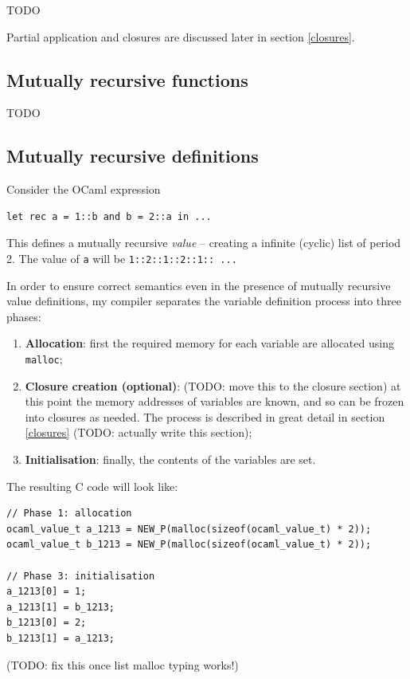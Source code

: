 \documentclass[12pt,a4paper,twoside,openright]{report}
\begin{document}
TODO

Partial application and closures are discussed later in section \ref{closures}.

\subsection{Mutually recursive functions}\label{mutually-recursive-functions}

TODO

\subsection{Mutually recursive definitions}\label{mutually-recursive-values}

Consider the OCaml expression

\begin{lstlisting}
let rec a = 1::b and b = 2::a in ...
\end{lstlisting}

This defines a mutually recursive \textit{value} -- creating a infinite
(cyclic) list of period 2. The value of \lstinline!a! will be
\lstinline!1::2::1::2::1:: ...!

In order to ensure correct semantics even in the presence of mutually recursive
value definitions, my compiler separates the variable definition process into
three phases:

\begin{enumerate}
  \item \textbf{Allocation}: first the required memory for each variable are
    allocated using \lstinline!malloc!;
  \item \textbf{Closure creation (optional)}: (TODO: move this to the closure section)  at this point the memory
    addresses of variables are known, and so can be frozen into closures as
    needed. The process is described in great detail in section \ref{closures}
    (TODO: actually write this section);
  \item \textbf{Initialisation}: finally, the contents of the variables are
    set.
\end{enumerate}

The resulting C code will look like:

\begin{lstlisting}
// Phase 1: allocation
ocaml_value_t a_1213 = NEW_P(malloc(sizeof(ocaml_value_t) * 2));
ocaml_value_t b_1213 = NEW_P(malloc(sizeof(ocaml_value_t) * 2));

// Phase 3: initialisation
a_1213[0] = 1;
a_1213[1] = b_1213;
b_1213[0] = 2;
b_1213[1] = a_1213;
\end{lstlisting}
(TODO: fix this once list malloc typing works!)
\end{document}
